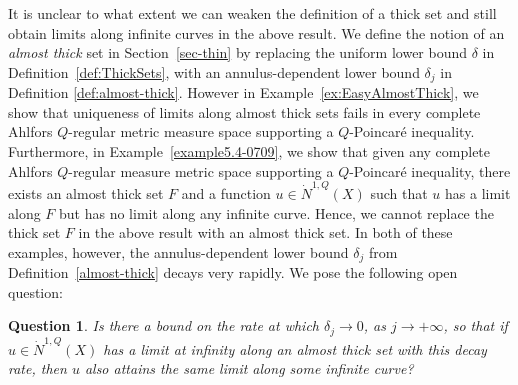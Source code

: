 \documentclass[10pt]{amsart}
\newtheorem{question}[theorem]{Question}
\numberwithin{equation}{section}
\begin{document}
 It is unclear to what extent we can weaken the definition of a thick set and still obtain limits along infinite curves in the above result.  We define the notion of an {\it almost thick} set in Section~\ref{sec-thin} by replacing the uniform lower bound $\delta$ in Definition~\ref{def:ThickSets}, with an annulus-dependent lower bound $\delta_j$ in Definition \ref{def:almost-thick}.
 However in Example~\ref{ex:EasyAlmostThick}, we show that uniqueness of limits along almost thick sets fails in every complete Ahlfors $Q$-regular metric measure space supporting a $Q$-Poincar\'e inequality.  Furthermore, in Example~\ref{example5.4-0709}, we show that given any complete Ahlfors $Q$-regular measure metric space supporting a $Q$-Poincar\'e inequality, there exists an almost thick set $F$ and a function $u\in\dot N^{1,Q}(X)$ such that $u$ has a limit along $F$ but has no limit along any infinite curve.  Hence, we cannot replace the thick set $F$ in the above result with an almost thick set.  In both of these examples, however, the annulus-dependent lower bound $\delta_j$ from Definition~\ref{almost-thick} decays very rapidly.  We pose the following open question:
 \begin{question}
Is there a bound on the rate at which $\delta_j\to 0$, as $j\to+\infty$, so that if $u\in\dot N^{1,Q}(X)$ has a limit at infinity along an almost thick set with this decay rate, then $u$ also attains the same limit along some infinite curve?  
 \end{question}
 
\end{document}
